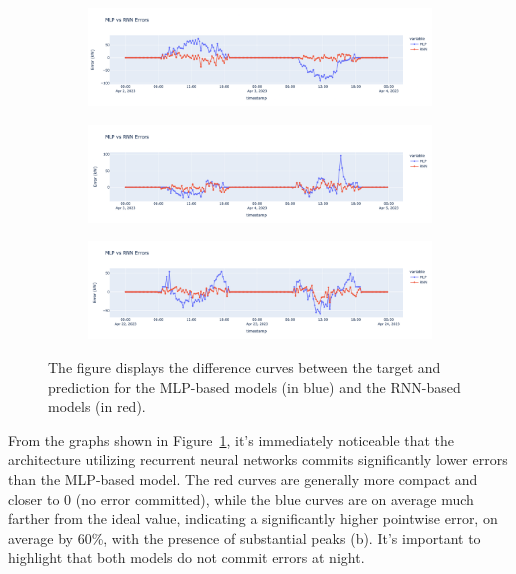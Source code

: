 \begin{figure}[H]
	\centering
	\begin{subfigure}{\textwidth}
		\centering
		\includegraphics[width=\textwidth]{chapters/4_evaluation/imgs/mlpvsrnn/mlpvsrnn1.png}
		\caption{}
	\end{subfigure}
	\begin{subfigure}{\textwidth}
		\centering
		\includegraphics[width=\textwidth]{chapters/4_evaluation/imgs/mlpvsrnn/mlpvsrnn2.png}
		\caption{}
	\end{subfigure}
	\begin{subfigure}{\textwidth}
		\centering
		\includegraphics[width=\textwidth]{chapters/4_evaluation/imgs/mlpvsrnn/mlpvsrnn3.png}
		\caption{}
	\end{subfigure}
	\caption{The figure displays the difference curves between the target and prediction for the MLP-based models (in blue) and the RNN-based models (in red).}
	\label{fig:mlpvsrnngrafici}
\end{figure}
From the graphs shown in Figure~\ref{fig:mlpvsrnngrafici},
it's immediately noticeable that the architecture utilizing
recurrent neural networks commits significantly lower errors
than the MLP-based model.
The red curves are generally more compact and closer to 0
(no error committed), while the blue curves are on average
much farther from the ideal value, indicating a significantly
higher pointwise error, on average by 60\%, with the presence
of substantial peaks (b).
It's important to highlight that both models do not commit errors at night.

